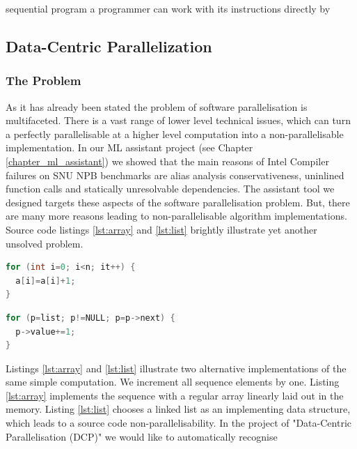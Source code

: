 \documentclass[10pt,a4paper]{report}
\begin{document}
sequential program a programmer can work with its instructions directly by 



\subsection{Data-Centric Parallelization}
\label{chapter_dcp}
\subsubsection{The Problem}
\quad As it has already been stated the problem of software parallelisation is multifaceted. There is a vast range of lower level technical issues, which can turn a perfectly parallelisable at a higher level computation into a non-parallelisable implementation. In our ML assistant project (see Chapter \ref{chapter_ml_assistant}) we showed that the main reasons of Intel Compiler failures on SNU NPB benchmarks are alias analysis conservativeness, uninlined function calls and statically unresolvable dependencies. The assistant tool we designed targets these aspects of the software parallelisation problem. But, there are many more reasons leading to non-parallelisable algorithm implementations. Source code listings \ref{lst:array} and \ref{lst:list} brightly illustrate yet another unsolved problem.\newline\null
\begin{minipage}[t]{0.45\linewidth}
\begin{lstlisting}[caption={Parallelisable loop operating on a \textbf{linear array}.},label={lst:array},language=C]
for (int i=0; i<n; it++) {
  a[i]=a[i]+1;
}
\end{lstlisting}
\end{minipage}
%
\begin{minipage}[t]{0.55\linewidth}
\begin{lstlisting}[caption={Non-parallelisable loop operating on a \textbf{linked-list}.},label={lst:list},language=C]
for (p=list; p!=NULL; p=p->next) {
  p->value+=1;
}
\end{lstlisting}
\end{minipage}
\quad Listings \ref{lst:array} and \ref{lst:list} illustrate two alternative implementations of the same simple computation. We increment all sequence elements by one. Listing \ref{lst:array} implements the sequence with a regular array linearly laid out in the memory. Listing \ref{lst:list} chooses a linked list as an implementing data structure, which leads to a source code non-parallelisability.\newline\null
\quad In the project of "Data-Centric Parallelisation (DCP)" we would like to automatically recognise 
\end{document}
